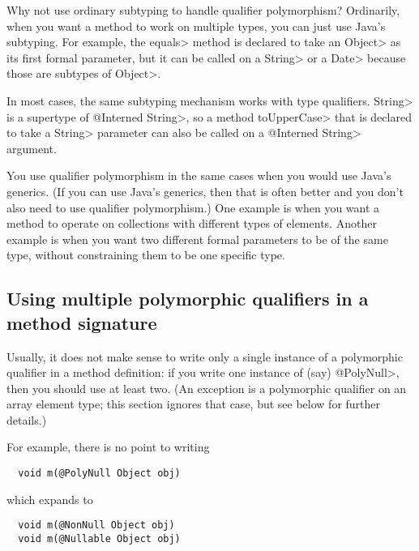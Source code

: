 Why not use ordinary subtyping to handle qualifier polymorphism?
Ordinarily, when you want a method to work on multiple types, you can just
use Java's subtyping.  For example, the \<equals> method is declared to
take an \<Object> as its first formal parameter, but it can be called on a
\<String> or a \<Date> because those are subtypes of \<Object>.

In most cases, the same subtyping mechanism works with type qualifiers.
\<String> is a supertype of \<@Interned String>, so a method \<toUpperCase>
that is declared to take a \<String> parameter can also be called on a
\<@Interned String> argument.

You use qualifier polymorphism in the same cases when you would use Java's
generics.  (If you can use Java's generics, then that is often better and
you don't also need to use qualifier polymorphism.)  One example is when
you want a method to operate on collections with different types of
elements.  Another example is when you want two different formal parameters
to be of the same type, without constraining them to be one specific type.


\subsection{Using multiple polymorphic qualifiers in a method signature\label{qualifier-polymorphism-multiple-qualifiers}}


Usually, it does not make sense to write only a single instance of a polymorphic
qualifier in a method definition:  if you write one instance of (say)
\<@PolyNull>, then you should use at least two.  (An exception is a
polymorphic qualifier on an array element type; this section ignores that
case, but see below for further details.)

For example, there is no point to writing

\begin{Verbatim}
  void m(@PolyNull Object obj)
\end{Verbatim}

\noindent
which expands to

\begin{Verbatim}
  void m(@NonNull Object obj)
  void m(@Nullable Object obj)
\end{Verbatim}

